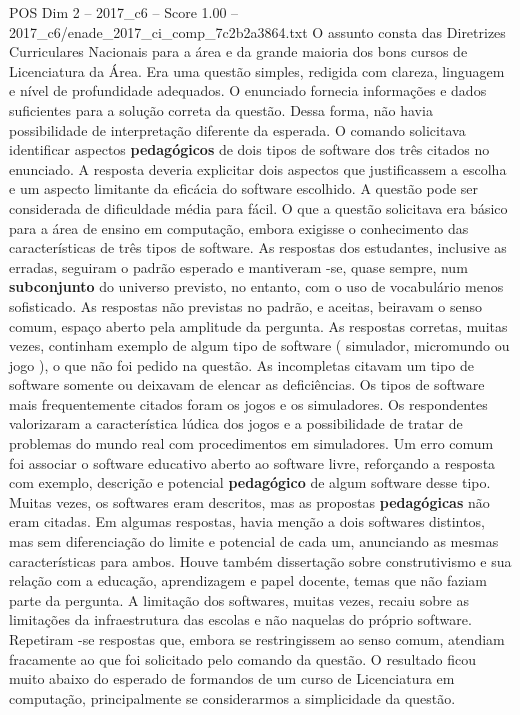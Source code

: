 \begin{textsample}{POS Dim 2 – 2017\_c6 – Score 1.00 – 2017\_c6/enade\_2017\_ci\_comp\_7c2b2a3864.txt}
O assunto consta das Diretrizes Curriculares Nacionais para a área e da grande maioria dos bons cursos de Licenciatura da Área.
Era uma questão simples, redigida com clareza, linguagem e nível de profundidade adequados.
O enunciado fornecia informações e dados suficientes para a solução correta da questão.
Dessa forma, não havia possibilidade de interpretação diferente da esperada.
O comando solicitava identificar aspectos \textbf{pedagógicos} de dois tipos de software dos três citados no enunciado.
A resposta deveria explicitar dois aspectos que justificassem a escolha e um aspecto limitante da eficácia do software escolhido.
A questão pode ser considerada de dificuldade média para fácil.
O que a questão solicitava era básico para a área de ensino em computação, embora exigisse o conhecimento das características de três tipos de software.
As respostas dos estudantes, inclusive as erradas, seguiram o padrão esperado e mantiveram -se, quase sempre, num \textbf{subconjunto} do universo previsto, no entanto, com o uso de vocabulário menos sofisticado.
As respostas não previstas no padrão, e aceitas, beiravam o senso comum, espaço aberto pela amplitude da pergunta.
As respostas corretas, muitas vezes, continham exemplo de algum tipo de software ( simulador, micromundo ou jogo ), o que não foi pedido na questão.
As incompletas citavam um tipo de software somente ou deixavam de elencar as deficiências.
Os tipos de software mais frequentemente citados foram os jogos e os simuladores.
Os respondentes valorizaram a característica lúdica dos jogos e a possibilidade de tratar de problemas do mundo real com procedimentos em simuladores.
Um erro comum foi associar o software educativo aberto ao software livre, reforçando a resposta com exemplo, descrição e potencial \textbf{pedagógico} de algum software desse tipo.
Muitas vezes, os softwares eram descritos, mas as propostas \textbf{pedagógicas} não eram citadas.
Em algumas respostas, havia menção a dois softwares distintos, mas sem diferenciação do limite e potencial de cada um, anunciando as mesmas características para ambos.
Houve também dissertação sobre construtivismo e sua relação com a educação, aprendizagem e papel docente, temas que não faziam parte da pergunta.
A limitação dos softwares, muitas vezes, recaiu sobre as limitações da infraestrutura das escolas e não naquelas do próprio software.
Repetiram -se respostas que, embora se restringissem ao senso comum, atendiam fracamente ao que foi solicitado pelo comando da questão.
O resultado ficou muito abaixo do esperado de formandos de um curso de Licenciatura em computação, principalmente se considerarmos a simplicidade da questão.

\end{textsample}
